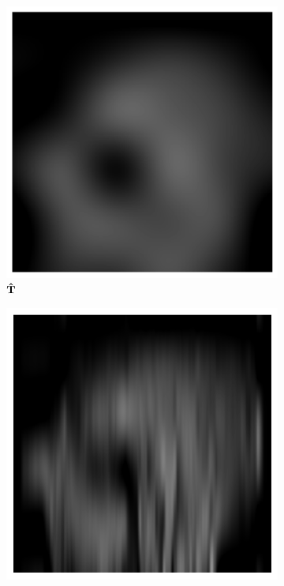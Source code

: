 \documentclass[10pt,twoside]{book}
\begin{document}
\begin{figure}
\begin{subfigure}{0.45\textwidth}
     \includegraphics[width=\textwidth]{smoothing2D_decimationFactor51_smoothingNaive}
     \caption{
     $\mathbf{\hat{T}}$
     }
  \end{subfigure}
  \begin{subfigure}{0.45\textwidth}
     \includegraphics[width=\textwidth]{smoothing2D_decimationFactor51_smoothingRowWise}

\end{subfigure}
\end{figure}
\end{document}
